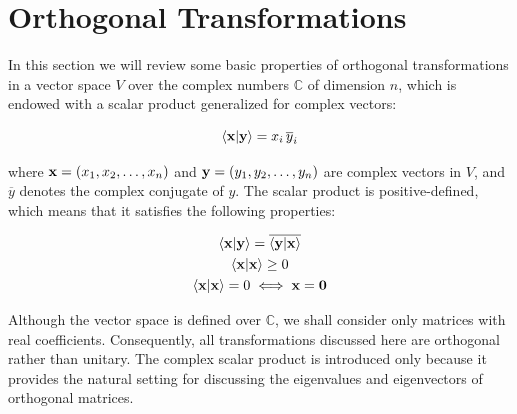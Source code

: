 \documentclass[12pt]{article}
\begin{document}
\section{Orthogonal Transformations}

In this section we will review some basic properties of orthogonal transformations in a
vector space $V$ over the complex numbers $\mathbb{C}$ of dimension $n$, which is endowed with
a scalar product generalized for complex vectors:

\[
  \ip{\vb{x}}{\vb{y}} = x_i\,\overline{y}_i
\]

where $\vb{x} = (x_1, x_2, \ldots, x_n)$ and $\vb{y} = (y_1, y_2, \ldots, y_n)$ are complex
vectors in $V$, and $\overline{y}$ denotes the complex conjugate of $y$. The scalar product
is positive-defined, which means that it satisfies the following properties:

\[
  \begin{gathered}
    \ip{\vb{x}}{\vb{y}} = \overline{\ip{\vb{y}}{\vb{x}}} \\
    \ip{\vb{x}}{\vb{x}} \geq 0 \\
    \ip{\vb{x}}{\vb{x}} = 0 \iff \vb{x} = \vb{0}
  \end{gathered}
\]

Although the vector space is defined over $\mathbb{C}$, we shall consider only matrices with real coefficients.
Consequently, all transformations discussed here are orthogonal rather than unitary.
The complex scalar product is introduced only because it provides the natural setting
for discussing the eigenvalues and eigenvectors of orthogonal matrices.
\end{document}
